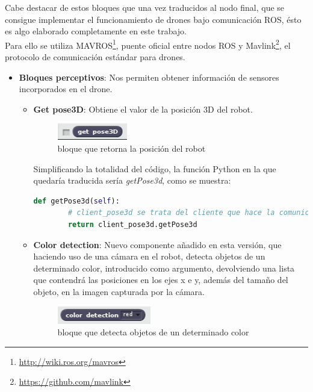 Cabe destacar de estos bloques que una vez traducidos al nodo final, que se consigue implementar el funcionamiento de drones bajo comunicación ROS, ésto es algo elaborado completamente en este trabajo.\\

Para ello se utiliza MAVROS\footnote{\url{http://wiki.ros.org/mavros}}, puente oficial entre nodos ROS y Mavlink\footnote{\url{https://github.com/mavlink}}, el protocolo de comunicación estándar para drones.

\begin{itemize}
\item \textbf{Bloques perceptivos}:
Nos permiten obtener información de sensores incorporados en el drone.
	\begin{itemize}
	\item \textbf{Get pose3D}: Obtiene el valor de la posición 3D del robot.
		\begin{figure}[H]
     		\centering
     		\includegraphics[scale=1.2]{img/block-pose.png}
     		\caption{bloque que retorna la posición del robot}
  		\label{fig:listas}
		\end{figure}
Simplificando la totalidad del código, la función Python en la que quedaría traducida sería \textit{getPose3d}, como se muestra:\\

\begin{lstlisting}[language=python,firstnumber=1]
    def getPose3d(self):
    	# client_pose3d se trata del cliente que hace la comunicacion ROS
        return client_pose3d.getPose3d
\end{lstlisting}
	\item \textbf{Color detection}: Nuevo componente añadido en esta versión, que haciendo uso de una cámara en el robot, detecta objetos de un determinado color, introducido como argumento, devolviendo una lista que contendrá las posiciones en los ejes x e y, además del tamaño del objeto, en la imagen capturada por la cámara.\\
	\begin{figure}[H]
     		\centering
     		\includegraphics[scale=1.2]{img/block-color.png}
     		\caption{bloque que detecta objetos de un determinado color}
  		\label{fig:listas}
  				\end{figure}
  				

\end{itemize}
\end{itemize}
